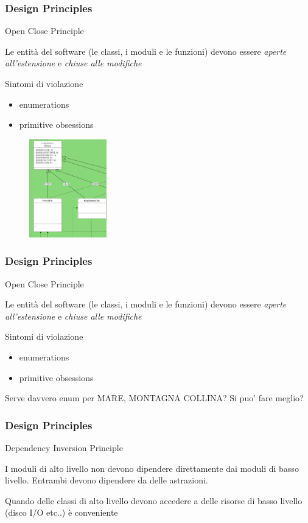 \documentclass{beamer}
\begin{document}
\begin{frame}
\frametitle{Design Principles}
Open Close Principle
\begin{framed}
Le entit\`a del software (le classi, i moduli e le funzioni) devono essere \emph{aperte all'estensione} e \emph{chiuse alle modifiche}\\
\end{framed}
Sintomi di violazione 
\begin{itemize}
\item enumerations
\item primitive obsessions 
\end{itemize}
\begin{figure}
\centering
\includegraphics[width=0.3\textwidth]{Img/primitiveObsession.png}
\end{figure}
\end{frame}

\begin{frame}
\frametitle{Design Principles}
Open Close Principle
\begin{framed}
Le entit\`a del software (le classi, i moduli e le funzioni) devono essere \emph{aperte all'estensione} e \emph{chiuse alle modifiche}\\
\end{framed}
Sintomi di violazione 
\begin{itemize}
\item enumerations
\item primitive obsessions 
\end{itemize}
Serve davvero enum per MARE, MONTAGNA COLLINA? Si puo' fare meglio?
\end{frame}

\begin{frame}
\frametitle{Design Principles}
Dependency Inversion Principle
\begin{framed}
I moduli di alto livello non devono dipendere direttamente dai moduli di basso livello. Entrambi devono dipendere da delle astrazioni.
\end{framed}
Quando delle classi di alto livello devono accedere a delle risorse di basso livello (disco I/O etc..) \`e conveniente
\end{frame}
\end{document}
